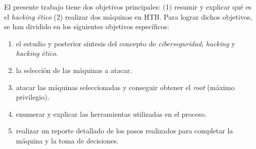 El presente trabajo tiene dos objetivos principales: (1) resumir y explicar qué es el \textit{hacking ético} (2) realizar dos máquinas en \acrfull{HTB}. Para lograr dichos objetivos, se han dividido en los siguientes objetivos específicos:
\begin{enumerate}
    \item el estudio y posterior síntesis del concepto de \textit{ciberseguridad}, \textit{hacking} y \textit{hacking ético}.
    \item la selección de las máquinas a atacar.
    \item atacar las máquinas seleccionadas y conseguir obtener el \textit{root} (máximo privilegio).
    \item enumerar y explicar las herramientas utilizadas en el proceso.
    \item realizar un reporte detallado de los pasos realizados para completar la máquina y la toma de decisiones.
\end{enumerate}
